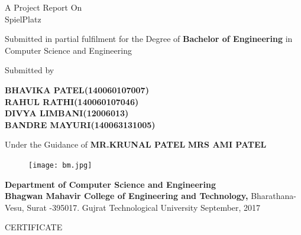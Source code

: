 \documentclass[12pt,a4paper,final,oneside]{report}
\begin{document}
\begin{center}
A Project Report On\\
\LARGE{SpielPlatz}
\end{center}
\vspace{2cm}
\begin{center}
Submitted in partial fulfilment for the
\linebreak Degree of \textbf{Bachelor of Engineering} in
\linebreak Computer Science and Engineering
\end{center}
\vspace{1cm}
\begin{center}
Submitted by 

\textbf{BHAVIKA PATEL(140060107007)}\\
\textbf{RAHUL RATHI(140060107046)}\\
\textbf{DIVYA LIMBANI(12006013)}\\
\textbf{BANDRE MAYURI(140063131005)}\\
\vspace{1cm}

Under the Guidance of 
\linebreak \textbf{MR.KRUNAL PATEL} \linebreak
\textbf{MRS AMI PATEL}
\end{center}

	\begin{figure}[h]
		\centering
		\texttt{[image: bm.jpg]}
		
	\end{figure}
\vspace{0.7cm}
\begin{center}
\textbf{Department of Computer Science and Engineering\\
Bhagwan Mahavir College of Engineering and Technology,}
\linebreak Bharathana-Vesu, Surat -395017.
\linebreak Gujrat Technological University
\linebreak September, 2017
\end{center}

\newpage
\thispagestyle{empty}
\begin{center}
		\LARGE{CERTIFICATE}
\end{center}
	
	
\vspace{2cm}
	
\end{document}
